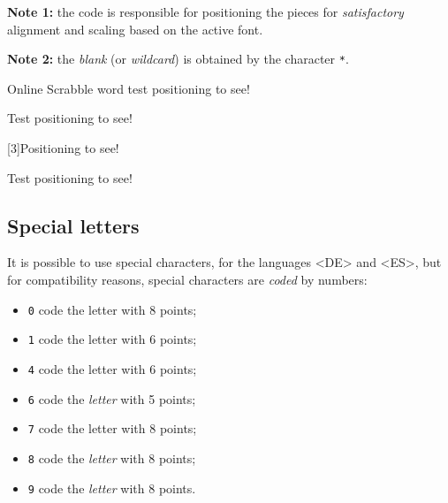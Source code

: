 \documentclass{article}
\begin{document}
\textbf{Note 1:} the code is responsible for positioning the pieces for \textit{satisfactory} alignment and scaling based on the active font.

\smallskip

\textbf{Note 2:} the \textit{blank} (or \textit{wildcard}) is obtained by the character \texttt{*}.

\begin{PresentationCode}{}
Online Scrabble word test positioning  to see!
\end{PresentationCode}

\begin{PresentationCode}{}
{\Huge\sffamily Test positioning  to see!}
\end{PresentationCode}

\begin{PresentationCode}{}
\scalebox{3}[3]{Positioning  to see!}
\end{PresentationCode}

\begin{PresentationCode}{}
{\LARGE Test positioning  to see!}
\end{PresentationCode}

\newpage

\subsection{Special letters}

It is possible to use special characters, for the languages \textsf{<DE>} and \textsf{<ES>}, but for compatibility reasons, special characters are \textit{coded} by numbers:

\begin{itemize}
	\item \texttt{0} code the letter  with 8 points;
	\item \texttt{1} code the letter  with 6 points;
	\item \texttt{4} code the letter  with 6 points;
	\item \texttt{6} code the \textit{letter}  with 5 points;
	\item \texttt{7} code the letter  with 8 points;
	\item \texttt{8} code the \textit{letter}  with 8 points;
	\item \texttt{9} code the \textit{letter}  with 8 points.
\end{itemize}
\end{document}
